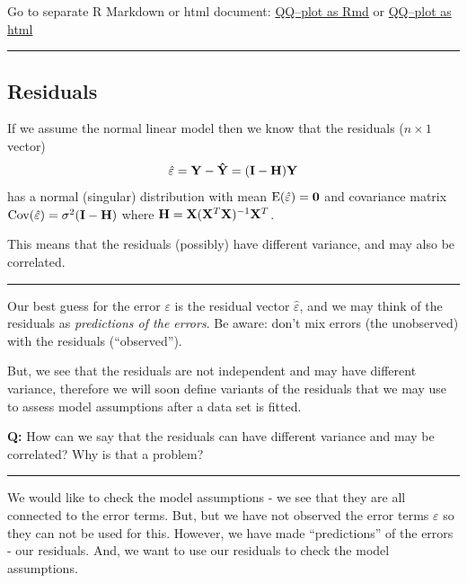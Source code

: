 \documentclass[
]{article}
\begin{document}
Go to separate R Markdown or html document:
\href{https://www.math.ntnu.no/emner/TMA4315/2017h/qq.Rmd}{QQ--plot as
Rmd} or
\href{https://www.math.ntnu.no/emner/TMA4315/2017h/qq.html}{QQ--plot as
html}

\begin{center}\rule{0.5\linewidth}{0.5pt}\end{center}

\hypertarget{residuals}{%
\subsection{Residuals}\label{residuals}}

If we assume the normal linear model then we know that the residuals
(\(n\times 1\) vector)
\[\hat{\varepsilon}={\bf Y}-{\bf \hat{Y}}=({\bf I}-{\bf H}){\bf Y}\] has
a normal (singular) distribution with mean
\(\text{E}(\hat{\varepsilon})={\bf 0}\) and covariance matrix
\(\text{Cov}(\hat{ \varepsilon})=\sigma^2({\bf I}-{\bf H})\) where
\({\bf H}={\bf X}({\bf X}^T{\bf X})^{-1}{\bf X}^T\).

This means that the residuals (possibly) have different variance, and
may also be correlated.

\begin{center}\rule{0.5\linewidth}{0.5pt}\end{center}

Our best guess for the error \(\varepsilon\) is the residual vector
\(\hat{\varepsilon}\), and we may think of the residuals as
\emph{predictions of the errors}. Be aware: don't mix errors (the
unobserved) with the residuals (``observed'').

But, we see that the residuals are not independent and may have
different variance, therefore we will soon define variants of the
residuals that we may use to assess model assumptions after a data set
is fitted.

\textbf{Q:} How can we say that the residuals can have different
variance and may be correlated? Why is that a problem?

\begin{center}\rule{0.5\linewidth}{0.5pt}\end{center}

We would like to check the model assumptions - we see that they are all
connected to the error terms. But, but we have not observed the error
terms \(\varepsilon\) so they can not be used for this. However, we have
made ``predictions'' of the errors - our residuals. And, we want to use
our residuals to check the model assumptions.
\end{document}
